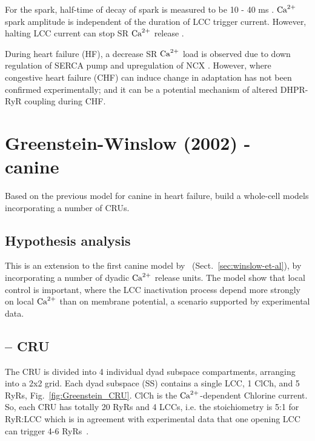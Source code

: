 For the spark, half-time of decay of spark is measured to be 10 - 40 ms
\citep{santana1996}. ${\text{Ca}^{2+}}$ spark amplitude is independent of the duration of LCC
trigger current. However, halting LCC current can stop SR ${\text{Ca}^{2+}}$ release
\citep{cleeman1991, wier1994lce}.

During heart failure (HF), a decrease SR ${\text{Ca}^{2+}}$ load is observed due to down
regulation of SERCA pump and upregulation of NCX
\citep{ORourke1999,winslow1999}. However, where congestive heart failure (CHF)
can induce change in adaptation has not been confirmed experimentally; and it
can be a potential mechanism of altered DHPR-RyR coupling during CHF.

\section{Greenstein-Winslow (2002) - canine}
\label{sec:greenst-winsl-2002}

Based on the previous model for canine in heart failure, \citep{greenstein2002}
build a whole-cell models incorporating a number of CRUs.

\subsection{Hypothesis analysis}
\label{sec:hypothesis-analysis-18}

This is an extension to the first canine model by~\citep{winslow1999}
(Sect.~\ref{sec:winslow-et-al}), by incorporating a number of dyadic
${\text{Ca}^{2+}}$ release units. The model show that local control is important,
where the LCC inactivation process depend more strongly on local ${\text{Ca}^{2+}}$
than on membrane potential, a scenario supported by experimental data.

\subsection{-- CRU}
\label{sec:cru}

The CRU is divided into 4 individual dyad subspace compartments,
arranging into a 2x2 grid. Each dyad subspace (SS) contains a single
LCC, 1 ClCh, and 5 RyRs, Fig.~\ref{fig:Greenstein_CRU}. ClCh is the
${\text{Ca}^{2+}}$-dependent Chlorine current. So, each CRU
has totally 20 RyRs and 4 LCCs, i.e. the stoichiometry is 5:1 for
RyR:LCC which is in agreement with experimental data that one opening
LCC can trigger 4-6 RyRs~\citep{wang2001}.

